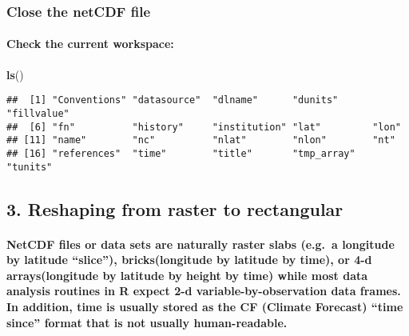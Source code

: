 \documentclass[]{article}
\newenvironment{Shaded}{\begin{snugshade}}{\end{snugshade}}
\newcommand{\KeywordTok}[1]{\textcolor[rgb]{0.13,0.29,0.53}{\textbf{#1}}}
\newcommand{\NormalTok}[1]{#1}
\let\oldparagraph\paragraph
\renewcommand{\paragraph}[1]{\oldparagraph{#1}\mbox{}}
\begin{document}
\subsubsection{Close the netCDF file}\label{close-the-netcdf-file}

\paragraph{Check the current
workspace:}\label{check-the-current-workspace}

\begin{Shaded}
\begin{Highlighting}[]
\KeywordTok{ls}\NormalTok{()}
\end{Highlighting}
\end{Shaded}

\begin{verbatim}
##  [1] "Conventions" "datasource"  "dlname"      "dunits"      "fillvalue"  
##  [6] "fn"          "history"     "institution" "lat"         "lon"        
## [11] "name"        "nc"          "nlat"        "nlon"        "nt"         
## [16] "references"  "time"        "title"       "tmp_array"   "tunits"
\end{verbatim}

\subsection{3. Reshaping from raster to
rectangular}\label{reshaping-from-raster-to-rectangular}

\paragraph{\texorpdfstring{NetCDF files or data sets are naturally
raster slabs (e.g.~a longitude by latitude ``slice''), bricks(longitude
by latitude by time), or 4-d arrays(longitude by latitude by height by
time) while most data analysis routines in R expect 2-d
variable-by-observation data frames. In addition, time is usually stored
as the CF (Climate Forecast) ``time since'' format that is not usually
human-readable.}{NetCDF files or data sets are naturally raster slabs (e.g.~a longitude by latitude slice), bricks(longitude by latitude by time), or 4-d arrays(longitude by latitude by height by time) while most data analysis routines in R expect 2-d variable-by-observation data frames. In addition, time is usually stored as the CF (Climate Forecast) time since format that is not usually human-readable.}}\label{netcdf-files-or-data-sets-are-naturally-raster-slabs-e.g.a-longitude-by-latitude-slice-brickslongitude-by-latitude-by-time-or-4-d-arrayslongitude-by-latitude-by-height-by-time-while-most-data-analysis-routines-in-r-expect-2-d-variable-by-observation-data-frames.-in-addition-time-is-usually-stored-as-the-cf-climate-forecast-time-since-format-that-is-not-usually-human-readable.}
\end{document}
